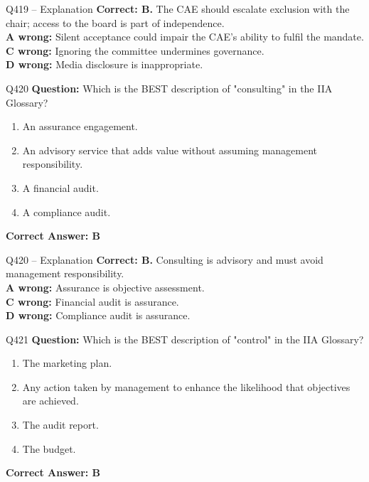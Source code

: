 \documentclass[aspectratio=169,10pt]{beamer}
\begin{document}
	\begin{frame}[t]{Q419 -- Explanation}
		\small
		\textbf{Correct: B.} The CAE should escalate exclusion with the chair; access to the board is part of independence. \\[4pt]
		\textbf{A wrong:} Silent acceptance could impair the CAE's ability to fulfil the mandate. \\[2pt]
		\textbf{C wrong:} Ignoring the committee undermines governance. \\[2pt]
		\textbf{D wrong:} Media disclosure is inappropriate.
	\end{frame}
	
	\begin{frame}[t]{Q420}
		\small
		\textbf{Question:} Which is the BEST description of "consulting" in the IIA Glossary?
		\begin{enumerate}[label=\Alph*.,itemsep=1pt,topsep=2pt]
			\item An assurance engagement.
			\item An advisory service that adds value without assuming management responsibility.
			\item A financial audit.
			\item A compliance audit.
		\end{enumerate}
		\vspace{4pt}
		\textbf{Correct Answer: B}
	\end{frame}
	
	\begin{frame}[t]{Q420 -- Explanation}
		\small
		\textbf{Correct: B.} Consulting is advisory and must avoid management responsibility. \\[4pt]
		\textbf{A wrong:} Assurance is objective assessment. \\[2pt]
		\textbf{C wrong:} Financial audit is assurance. \\[2pt]
		\textbf{D wrong:} Compliance audit is assurance.
	\end{frame}
	
	\begin{frame}[t]{Q421}
		\small
		\textbf{Question:} Which is the BEST description of "control" in the IIA Glossary?
		\begin{enumerate}[label=\Alph*.,itemsep=1pt,topsep=2pt]
			\item The marketing plan.
			\item Any action taken by management to enhance the likelihood that objectives are achieved.
			\item The audit report.
			\item The budget.
		\end{enumerate}
		\vspace{4pt}
		\textbf{Correct Answer: B}
	\end{frame}
	
\end{document}
